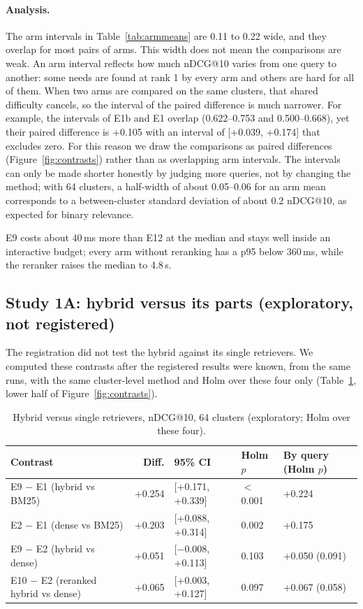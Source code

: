 \documentclass[11pt,a4paper]{article}
\makeatletter
\newcommand{\ndcg}{nDCG@10}
\makeatother
\begin{document}
\paragraph{Analysis.} The arm intervals in Table~\ref{tab:armmeans} are 0.11 to 0.22 wide, and they overlap for most pairs of arms. This width does not mean the comparisons are weak. An arm interval reflects how much \ndcg{} varies from one query to another: some needs are found at rank 1 by every arm and others are hard for all of them. When two arms are compared on the same clusters, that shared difficulty cancels, so the interval of the paired difference is much narrower. For example, the intervals of E1b and E1 overlap (0.622--0.753 and 0.500--0.668), yet their paired difference is +0.105 with an interval of [+0.039, +0.174] that excludes zero. For this reason we draw the comparisons as paired differences (Figure~\ref{fig:contrasts}) rather than as overlapping arm intervals. The intervals can only be made shorter honestly by judging more queries, not by changing the method; with 64 clusters, a half-width of about 0.05--0.06 for an arm mean corresponds to a between-cluster standard deviation of about 0.2 \ndcg{}, as expected for binary relevance.

E9 costs about 40\,ms more than E12 at the median and stays well inside an interactive budget; every arm without reranking has a p95 below 360\,ms, while the reranker raises the median to 4.8\,s.

\subsection{Study 1A: hybrid versus its parts (exploratory, not registered)}

The registration did not test the hybrid against its single retrievers. We computed these contrasts after the registered results were known, from the same runs, with the same cluster-level method and Holm over these four only (Table~\ref{tab:hybrid}, lower half of Figure~\ref{fig:contrasts}).

\begin{table}[tbp]
\centering\small
\caption{Hybrid versus single retrievers, \ndcg{}, 64 clusters (exploratory; Holm over these four).}
\label{tab:hybrid}
\begin{tabular}{lrlll}
\toprule
Contrast & Diff. & 95\% CI & Holm $p$ & By query (Holm $p$) \\
\midrule
E9 $-$ E1 (hybrid vs BM25) & +0.254 & [+0.171, +0.339] & $<$0.001 & +0.224 \\
E2 $-$ E1 (dense vs BM25) & +0.203 & [+0.088, +0.314] & 0.002 & +0.175 \\
E9 $-$ E2 (hybrid vs dense) & +0.051 & [$-$0.008, +0.113] & 0.103 & +0.050 (0.091) \\
E10 $-$ E2 (reranked hybrid vs dense) & +0.065 & [+0.003, +0.127] & 0.097 & +0.067 (0.058) \\
\bottomrule
\end{tabular}
\end{table}
\end{document}
